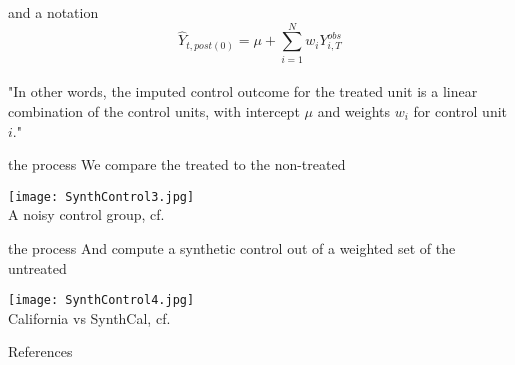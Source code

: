 \documentclass[aspectratio=169]{beamer}
\begin{document}
		\begin{frame}{and a notation}
			\begin{equation}
				\hat Y_{t,post(0)}  = \mu + \sum_{i=1}^{N}{w_iY_{i,T}^{obs}}
			\end{equation}
			\\ \vspace*{1.5cm}
			"{In other words, the imputed control outcome for the treated unit is a linear combination of the control units, with intercept $\mu$ and weights $w_i$ for control unit $i$.}" \cite{Doudchenko2016}
		\end{frame}

		\begin{frame}{the process}
			We compare the treated to the non-treated
			\begin{center}
				\texttt{[image: SynthControl3.jpg]}
				\\\tiny{A noisy control group, cf. \cite{Abadie2010}}
			\end{center}
		\end{frame}

		\begin{frame}{the process}
			And compute a synthetic control out of a weighted set of the untreated
			\begin{center}
				\texttt{[image: SynthControl4.jpg]}
				\\\tiny{California vs SynthCal, cf. \cite{Abadie2010}}
			\end{center}
		\end{frame}

	\begin{frame}[t, allowframebreaks]{References}
	  \printbibliography
	\end{frame}
\end{document}
